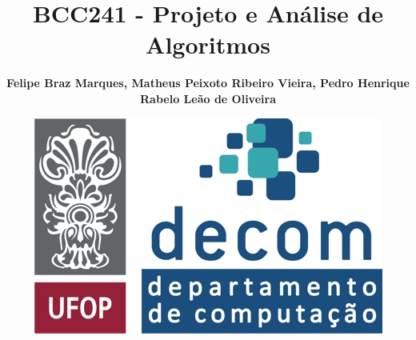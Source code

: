 \newcommand{\mr}[2]{\multirow{#1}{*}{#2}}
\newcommand{\mc}[2]{\multicolumn{#1}{|c|}{#2}}




\author[psilva]{\textbf{Felipe Braz Marques, Matheus Peixoto Ribeiro Vieira, Pedro Henrique Rabelo Leão de Oliveira}}
\title[BCC241]{BCC241 - Projeto e Análise de Algoritmos}
\date{
\vskip4mm
\includegraphics[scale=0.5]{setup/logos.jpg}
}

\AtBeginSection[]{
    \begin{frame}
        \vfill
        \centering
            \begin{beamercolorbox}[sep=8pt,center,shadow=true,rounded=true]{title}
            \usebeamerfont{title}\insertsectionhead\par%
        \end{beamercolorbox}
        \vfill
    \end{frame}
}

\newcommand{\begindocument}[1]{
  {\setbeamertemplate{footline}{} %
  \begin{frame}[plain]%
    \titlepage
  \end{frame}
  }
  #1
  \begin{frame}{Conteúdo}
    \begin{small}
        \tableofcontents
    \end{small}
  \end{frame}
}
